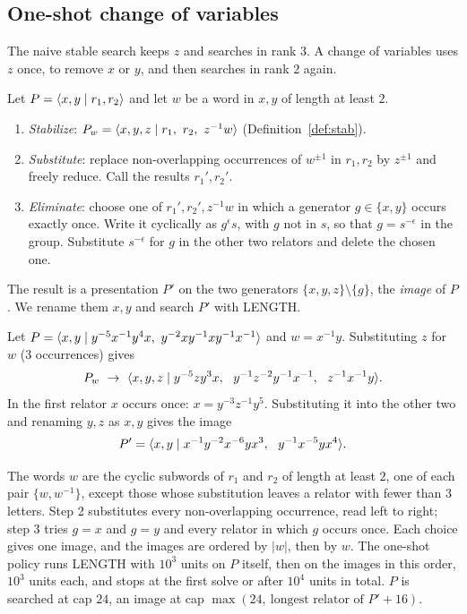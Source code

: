 \subsection{One-shot change of variables}\label{sec:cov}

The naive stable search keeps $z$ and searches in rank $3$. A change of variables uses $z$ once, to remove $x$ or $y$,
and then searches in rank $2$ again.

\begin{definition}\label{def:cov}
Let $P=\langle x,y \mid r_1,r_2 \rangle$ and let $w$ be a word in $x,y$ of length at least $2$.
\begin{enumerate}
  \item \emph{Stabilize}: $P_w=\langle x,y,z \mid r_1,\ r_2,\ z^{-1}w \rangle$ (Definition~\ref{def:stab}).
  \item \emph{Substitute}: replace non-overlapping occurrences of $w^{\pm1}$ in $r_1,r_2$ by $z^{\pm1}$ and freely
  reduce. Call the results $r_1',r_2'$.
  \item \emph{Eliminate}: choose one of $r_1',r_2',z^{-1}w$ in which a generator $g\in\{x,y\}$ occurs exactly once.
  Write it cyclically as $g^{\epsilon}s$, with $g$ not in $s$, so that $g=s^{-\epsilon}$ in the group. Substitute
  $s^{-\epsilon}$ for $g$ in the other two relators and delete the chosen one.
\end{enumerate}
The result is a presentation $P'$ on the two generators $\{x,y,z\}\setminus\{g\}$, the \emph{image} of $P$. We rename
them $x,y$ and search $P'$ with LENGTH.
\end{definition}

\begin{example}
Let $P=\pres{x,y}{y^{-5}x^{-1}y^{4}x,\ y^{-2}xy^{-1}xy^{-1}x^{-1}}$ and $w=x^{-1}y$. Substituting $z$ for
$w$ ($3$ occurrences) gives
\[
P_w\ \to\ \pres{x,y,z}{y^{-5}zy^{3}x,\ \ y^{-1}z^{-2}y^{-1}x^{-1},\ \ z^{-1}x^{-1}y}.
\]
In the first relator $x$ occurs once: $x=y^{-3}z^{-1}y^{5}$. Substituting it into the other two and renaming
$y,z$ as $x,y$ gives the image
\[
P'=\pres{x,y}{x^{-1}y^{-2}x^{-6}yx^{3},\ \ y^{-1}x^{-5}yx^{4}}.
\]
\end{example}

\begin{definition}\label{def:oneshot}
The words $w$ are the cyclic subwords of $r_1$ and $r_2$ of length at least $2$, one of each pair $\{w,w^{-1}\}$,
except those whose substitution leaves a relator with fewer than $3$ letters. Step 2 substitutes every
non-overlapping occurrence, read left to right; step 3 tries $g=x$ and $g=y$ and every relator in which $g$ occurs once.
Each choice gives one image, and the images are ordered by $|w|$, then by $w$. The one-shot policy runs LENGTH with
$10^3$ units on $P$ itself, then on the images in this order, $10^3$ units each, and stops at the first solve or after
$10^4$ units in total. $P$ is searched at cap $24$, an image at cap $\max(24,\ \text{longest relator of }P'+16)$.
\end{definition}

